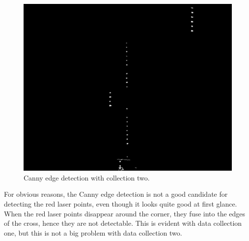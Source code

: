 \begin{figure}[ht!]
\begin{minipage}[t]{0.3\textwidth}
		\centering	
		\includegraphics[width=1\textwidth]{figures/ImageAnalysis/Canny/s7.png}
	\end{minipage}
	\caption{Canny edge detection with collection two.}
	\label{fig:Canny2}
\end{figure}

For obvious reasons, the Canny edge detection is not a good candidate for detecting the red laser points, even though it looks quite good at first glance. When the red laser points disappear around the corner, they fuse into the edges of the cross, hence they are not detectable. This is evident with data collection one, but this is not a big problem with data collection two. 

\FloatBarrier
